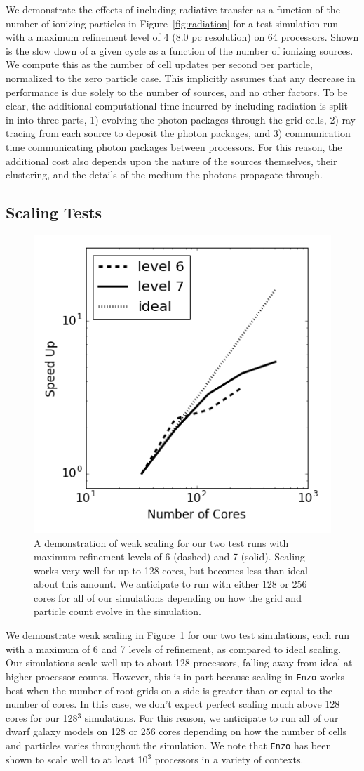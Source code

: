 \documentclass[11pt]{article}
\begin{document}
We demonstrate the effects of including radiative transfer as a function of the number of ionizing particles in Figure~\ref{fig:radiation} for a test simulation run with a maximum refinement level of 4 (8.0 pc resolution) on 64 processors. Shown is the slow down of a given cycle as a function of the number of ionizing sources. We compute this as the number of cell updates per second per particle, normalized to the zero particle case. This implicitly assumes that any decrease in performance is due solely to the number of sources, and no other factors. To be clear, the additional computational time incurred by including radiation is split in into three parts, 1) evolving the photon packages through the grid cells, 2) ray tracing from each source to deposit the photon packages, and 3) communication time communicating photon packages between processors. For this reason, the additional cost also depends upon the nature of the sources themselves, their clustering, and the details of the medium the photons propagate through.

\subsection{Scaling Tests}

\begin{figure}
\centering
\includegraphics[width=0.45\linewidth]{enzo_scaling}
\caption{A demonstration of weak scaling for our two test runs with maximum refinement levels of 6 (dashed) and 7 (solid). Scaling works very well for up to 128 cores, but becomes less than ideal about this amount. We anticipate to run with either 128 or 256 cores for all of our simulations depending on how the grid and particle count evolve in the simulation.}
\label{fig:scaling}
\end{figure}

We demonstrate weak scaling in Figure~\ref{fig:scaling} for our two test simulations, each run with a maximum of 6 and 7 levels of refinement, as compared to ideal scaling. Our simulations scale well up to about 128 processors, falling away from ideal at higher processor counts. However, this is in part because scaling in \texttt{Enzo} works best when the number of root grids on a side is greater than or equal to the number of cores. In this case, we don't expect perfect scaling much above 128 cores for our 128$^3$ simulations. For this reason, we anticipate to run all of our dwarf galaxy models on 128 or 256 cores depending on how the number of cells and particles varies throughout the simulation. We note that \texttt{Enzo} has been shown to scale well to at least 10$^3$ processors in a variety of contexts.



\end{document}
